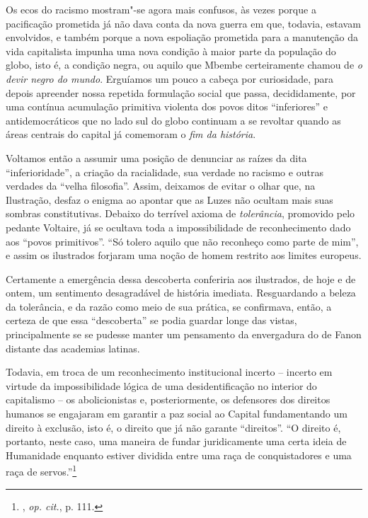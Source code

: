 Os ecos do racismo mostram"-se
agora mais confusos, às vezes porque a pacificação prometida já não dava
conta da nova guerra em que, todavia, estavam envolvidos, e também
porque a nova espoliação prometida para a manutenção da vida capitalista
impunha uma nova condição à maior parte da população do globo, isto é, a
condição negra, ou aquilo que Mbembe certeiramente chamou de \emph{o
devir negro do mundo}. Erguíamos um pouco a cabeça por curiosidade, para
depois apreender nossa repetida formulação social que passa,
decididamente, por uma contínua acumulação primitiva violenta dos povos
ditos ``inferiores'' e antidemocráticos que no lado sul do globo
continuam a se revoltar quando as áreas centrais do capital já comemoram
o \emph{fim da história}.

Voltamos então a assumir uma
posição de denunciar as raízes da dita ``inferioridade'', a criação da
racialidade, sua verdade no racismo e outras verdades da ``velha
filosofia''. Assim, deixamos de evitar o olhar que, na Ilustração,
desfaz o enigma ao apontar que as Luzes não ocultam mais suas sombras
constitutivas. Debaixo do terrível axioma de \emph{tolerância},
promovido pelo pedante Voltaire, já se ocultava toda a impossibilidade
de reconhecimento dado aos ``povos primitivos''. ``Só tolero aquilo que
não reconheço como parte de mim'', e assim os ilustrados forjaram uma
noção de homem restrito aos limites europeus.

Certamente a emergência dessa descoberta conferiria aos ilustrados, de
hoje e de ontem, um sentimento desagradável de história imediata.
Resguardando a beleza da tolerância, e da razão como meio de sua
prática, se confirmava, então, a certeza de que essa ``descoberta'' se
podia guardar longe das vistas, principalmente se se pudesse manter um
pensamento da envergadura do de Fanon distante das academias latinas.

Todavia, em troca de um reconhecimento institucional incerto -- incerto
em virtude da impossibilidade lógica de uma desidentificação no interior
do capitalismo -- os abolicionistas e, posteriormente, os defensores dos
direitos humanos se engajaram em garantir a paz social ao Capital
fundamentando um direito à exclusão, isto é, o direito que já não
garante ``direitos''. ``O direito é, portanto, neste caso, uma maneira
de fundar juridicamente uma certa ideia de Humanidade enquanto estiver
dividida entre uma raça de conquistadores e uma raça de
servos.''\footnote{, \emph{op. cit.}, p. 111.}

